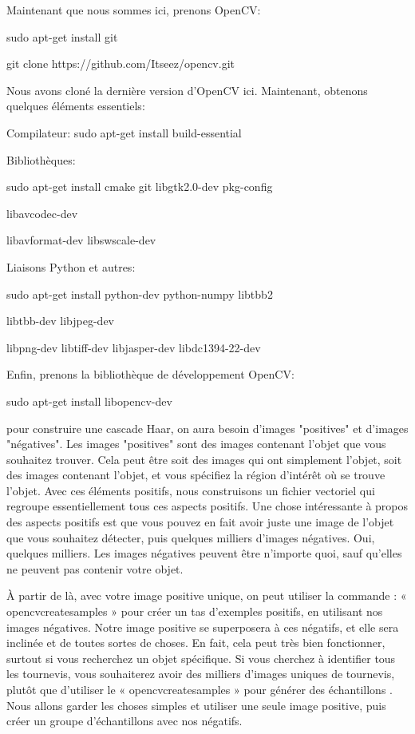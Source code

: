 \documentclass[11pt]{report}
\begin{document}
Maintenant que nous sommes ici, prenons OpenCV:

sudo apt-get install git

git clone https://github.com/Itseez/opencv.git

Nous avons cloné la dernière version d'OpenCV ici. Maintenant, obtenons quelques
éléments essentiels:

Compilateur: sudo apt-get install build-essential

Bibliothèques:

sudo apt-get install cmake git libgtk2.0-dev pkg-config 

libavcodec-dev

libavformat-dev libswscale-dev

Liaisons Python et autres:

sudo apt-get install python-dev python-numpy libtbb2 

libtbb-dev libjpeg-dev

libpng-dev libtiff-dev libjasper-dev libdc1394-22-dev

Enfin, prenons la bibliothèque de développement OpenCV:

sudo apt-get install libopencv-dev

pour construire une cascade Haar, on aura besoin d'images "positives" et d'images
"négatives". Les images "positives" sont des images contenant l'objet que vous
souhaitez trouver. Cela peut être soit des images qui ont simplement l'objet, soit des
images contenant l'objet, et vous spécifiez la région d'intérêt où se trouve l'objet. Avec
ces éléments positifs, nous construisons un fichier vectoriel qui regroupe essentiellement
tous ces aspects positifs. Une chose intéressante à propos des aspects positifs est que
vous pouvez en fait avoir juste une image de l’objet que vous souhaitez détecter, puis
quelques milliers d’images négatives. Oui, quelques milliers. Les images négatives
peuvent être n'importe quoi, sauf qu'elles ne peuvent pas contenir votre objet.

À partir de là, avec votre image positive unique, on peut utiliser la commande :
« opencvcreatesamples » pour créer un tas d'exemples positifs, en utilisant nos
images négatives. Notre image positive se superposera à ces négatifs, et elle sera
inclinée et de toutes sortes de choses. En fait, cela peut très bien fonctionner, surtout si
vous recherchez un objet spécifique. Si vous cherchez à identifier tous les tournevis,
vous souhaiterez avoir des milliers d'images uniques de tournevis, plutôt que d'utiliser
le « opencvcreatesamples » pour générer des échantillons . Nous allons garder
les choses simples et utiliser une seule image positive, puis créer un groupe
d'échantillons avec nos négatifs.
\end{document}
